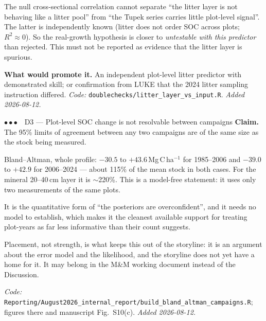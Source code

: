 \documentclass[11pt]{article}
\newcommand{\stA}{\textcolor{stgood}{$\bullet\bullet\bullet$}}  %
\begin{document}
\begin{caveat}
The null cross-sectional correlation cannot separate ``the litter layer is not behaving
like a litter pool'' from ``the Tupek series carries little plot-level signal''. The latter
is independently known (litter does not order SOC across plots; $R^2\approx0$). So the
real-growth hypothesis is closer to \emph{untestable with this predictor} than rejected.
This must not be reported as evidence that the litter layer is spurious.
\end{caveat}

\noindent\textbf{What would promote it.} An independent plot-level litter predictor with
demonstrated skill; or confirmation from LUKE that the 2024 litter sampling instruction
differed. \emph{Code:} \texttt{doublechecks/litter\_layer\_vs\_input.R}. \emph{Added 2026-08-12.}

\begin{finding}{\stA\ \ D3 --- Plot-level SOC change is not resolvable between campaigns}
\textbf{Claim.} The 95\% limits of agreement between any two campaigns are of the same size
as the stock being measured.
\end{finding}

\noindent Bland--Altman, whole profile: $-30.5$ to $+43.6$\,Mg\,C\,ha$^{-1}$ for 1985--2006 and
$-39.0$ to $+42.9$ for 2006--2024 --- about 115\% of the mean stock in both cases. For the
mineral 20--40\,cm layer it is $\sim$220\%. This is a model-free statement: it uses only two
measurements of the same plots.

\medskip
\noindent It is the quantitative form of ``the posteriors are overconfident'', and it needs
no model to establish, which makes it the cleanest available support for treating
plot-years as far less informative than their count suggests.

\begin{caveat}
Placement, not strength, is what keeps this out of the storyline: it is an argument about
the error model and the likelihood, and the storyline does not yet have a home for it. It
may belong in the M\&M working document instead of the Discussion.
\end{caveat}

\noindent\emph{Code:} \texttt{Reporting/August2026\_internal\_report/build\_bland\_altman\_campaigns.R};
figures there and manuscript Fig.~S10(c). \emph{Added 2026-08-12.}

\end{document}
